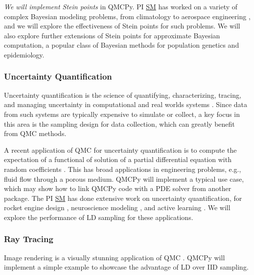 \documentclass[11pt]{NSFamsart}
\newcommand{\SM}{\hyperlink{SMlink}{SM}\xspace}
\begin{document}
\textit{We will implement Stein points} in QMCPy. PI \SM has worked on a variety of complex Bayesian modeling problems, from climatology \cite{mak2016regional} to aerospace engineering \cite{mak2018efficient,chang2019kernel,yeh2018common}, and we will explore the effectiveness of Stein points for such problems. We will also explore further extensions of Stein points for approximate Bayesian computation, a popular class of Bayesian methods for population genetics and epidemiology.

\subsubsection{Uncertainty Quantification}
Uncertainty quantification is the science of quantifying, characterizing, tracing, and managing uncertainty in computational and real worlds systems \cite{smartuq, Smi14a}. Since data from such systems are typically expensive to simulate or collect, a key focus in this area is the sampling design for data collection, which can greatly benefit from QMC methods.

A recent application of QMC for uncertainty quantification is to compute the expectation of a functional of solution of a partial differential equation with random coefficients \cite{HerSch20a}. This has broad applications in engineering problems, e.g., fluid flow through a porous medium. QMCPy will implement a typical use case, which may show how to link QMCPy code with a PDE solver from another package. The PI \SM has done extensive work on uncertainty quantification, for rocket engine design \cite{li2017two,li2018uncertainty,chang2019kernel,yeh2018common,mak2018efficient}, neuroscience modeling \cite{wang2020uncertainty}, and active learning \cite{mak2018maximum}. We will explore the performance of LD sampling for these applications.

\subsubsection{Ray Tracing}
Image rendering is a visually stunning application of QMC \cite{Keller2013a}.  QMCPy will implement a simple example to showcase the advantage of LD over IID sampling.

\end{document}
